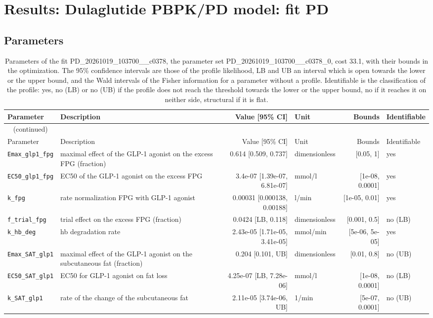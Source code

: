 \documentclass{article}
\begin{document}
\section{Results: Dulaglutide PBPK/PD model: fit PD}

\subsection{Parameters}

\begin{longtable}{llrlrl}
\caption{Parameters of the fit PD\_20261019\_103700\_\_c0378, the parameter set PD\_20261019\_103700\_\_c0378\_0, cost 33.1, with their bounds in the optimization. The 95\% confidence intervals are those of the profile likelihood, LB and UB an interval which is open towards the lower or the upper bound, and the Wald intervals of the Fisher information for a parameter without a profile. Identifiable is the classification of the profile: yes, no (LB) or no (UB) if the profile does not reach the threshold towards the lower or the upper bound, no if it reaches it on neither side, structural if it is flat.}\label{tab:parameters:PD_20261019_103700__c0378} \\
\toprule
Parameter & Description & Value [95\% CI] & Unit & Bounds & Identifiable \\
\midrule
\endfirsthead
\multicolumn{6}{l}{\small\tablename~\thetable{} (continued)} \\
\toprule
Parameter & Description & Value [95\% CI] & Unit & Bounds & Identifiable \\
\midrule
\endhead
\bottomrule
\endlastfoot
\texttt{Emax\_glp1\_fpg} & maximal effect of the GLP-1 agonist on the excess FPG (fraction) & 0.614 [0.509, 0.737] & dimensionless & [0.05, 1] & yes \\
\texttt{EC50\_glp1\_fpg} & EC50 of the GLP-1 agonist on the excess FPG & 3.4e-07 [1.39e-07, 6.81e-07] & mmol/l & [1e-08, 0.0001] & yes \\
\texttt{k\_fpg} & rate normalization FPG with GLP-1 agonist & 0.00031 [0.000138, 0.00188] & l/min & [1e-05, 0.01] & yes \\
\texttt{f\_trial\_fpg} & trial effect on the excess FPG (fraction) & 0.0424 [LB, 0.118] & dimensionless & [0.001, 0.5] & no (LB) \\
\texttt{k\_hb\_deg} & hb degradation rate & 2.43e-05 [1.71e-05, 3.41e-05] & mmol/min & [5e-06, 5e-05] & yes \\
\texttt{Emax\_SAT\_glp1} & maximal effect of the GLP-1 agonist on the subcutaneous fat (fraction) & 0.204 [0.101, UB] & dimensionless & [0.01, 0.8] & no (UB) \\
\texttt{EC50\_SAT\_glp1} & EC50 for GLP-1 agonist on fat loss & 4.25e-07 [LB, 7.28e-06] & mmol/l & [1e-08, 0.0001] & no (LB) \\
\texttt{k\_SAT\_glp1} & rate of the change of the subcutaneous fat & 2.11e-05 [3.74e-06, UB] & 1/min & [5e-07, 0.0001] & no (UB) \\
\end{longtable}
\end{document}
